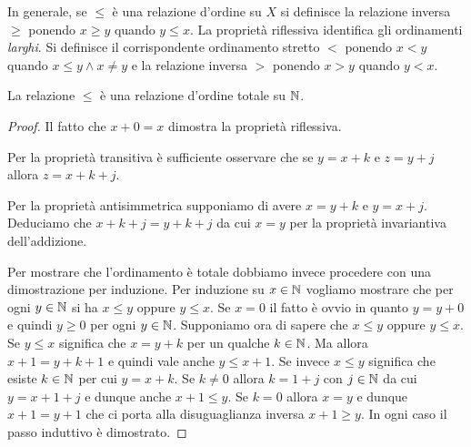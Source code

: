 In generale, se $\le$ è una relazione d'ordine su $X$ si definisce la 
relazione inversa $\ge$ ponendo $x\ge y$ quando $y\le x$.
La proprietà riflessiva identifica gli ordinamenti \emph{larghi}.
Si definisce il corrispondente ordinamento stretto $<$
ponendo $x < y$ quando $x\le y \land x\neq y$
e la relazione inversa $>$ ponendo $x>y$ quando $y<x$.
  
\begin{theorem}
La relazione $\le$ è una relazione d'ordine totale su ${\mathbb N}$.
\end{theorem}
%
\begin{proof}
  Il fatto che $x+0=x$ dimostra la proprietà riflessiva.
  
  Per la proprietà transitiva è sufficiente osservare
  che se $y=x+k$ e $z=y+j$ allora $z=x+k+j$.

  Per la proprietà antisimmetrica supponiamo di avere $x=y+k$ 
  e $y=x+j$. Deduciamo che $x+k+j = y +k+j$ da cui $x=y$
  per la proprietà invariantiva dell'addizione.
  
  Per mostrare che l'ordinamento è totale dobbiamo invece 
  procedere con una dimostrazione per induzione. 
  Per induzione su $x\in {\mathbb N}$ vogliamo mostrare 
  che per ogni $y\in {\mathbb N}$ si ha $x\le y$ oppure $y\le x$. 
  Se $x=0$ il fatto è ovvio in quanto $y=y+0$ e quindi $y\ge 0$
  per ogni $y\in {\mathbb N}$.
  Supponiamo ora di sapere che $x\le y$ oppure $y\le x$.
  Se $y\le x$ significa che $x = y + k$ per un qualche 
  $k\in {\mathbb N}$. Ma allora $x+1 = y + k + 1$ e quindi 
  vale anche $y\le x+1$. 
  Se invece $x\le y$ significa che esiste $k\in {\mathbb N}$ 
  per cui $y=x+k$. Se $k\neq 0$ allora $k=1+j$ con $j\in {\mathbb N}$
  da cui $y=x+1+j$ e dunque anche $x+1\le y$.
  Se $k=0$ allora $x=y$ e dunque $x+1=y+1$ che ci porta 
  alla disuguaglianza inversa $x+1\ge y$.
  In ogni caso il passo induttivo è dimostrato.
\end{proof}

